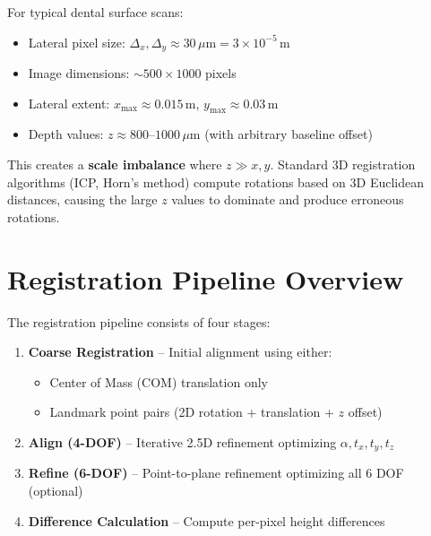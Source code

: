 \documentclass[11pt,a4paper]{article}
\begin{document}
For typical dental surface scans:
\begin{itemize}
    \item Lateral pixel size: $\Delta_x, \Delta_y \approx 30\,\mu\text{m} = 3 \times 10^{-5}\,\text{m}$
    \item Image dimensions: $\sim 500 \times 1000$ pixels
    \item Lateral extent: $x_{\max} \approx 0.015\,\text{m}$, $y_{\max} \approx 0.03\,\text{m}$
    \item Depth values: $z \approx 800\text{--}1000\,\mu\text{m}$ (with arbitrary baseline offset)
\end{itemize}

This creates a \textbf{scale imbalance} where $z \gg x, y$. Standard 3D registration algorithms (ICP, Horn's method) compute rotations based on 3D Euclidean distances, causing the large $z$ values to dominate and produce erroneous rotations.

\section{Registration Pipeline Overview}

The registration pipeline consists of four stages:

\begin{enumerate}
    \item \textbf{Coarse Registration} -- Initial alignment using either:
    \begin{itemize}
        \item Center of Mass (COM) translation only
        \item Landmark point pairs (2D rotation + translation + $z$ offset)
    \end{itemize}

    \item \textbf{Align (4-DOF)} -- Iterative 2.5D refinement optimizing $\alpha, t_x, t_y, t_z$

    \item \textbf{Refine (6-DOF)} -- Point-to-plane refinement optimizing all 6 DOF (optional)

    \item \textbf{Difference Calculation} -- Compute per-pixel height differences
\end{enumerate}
\end{document}
